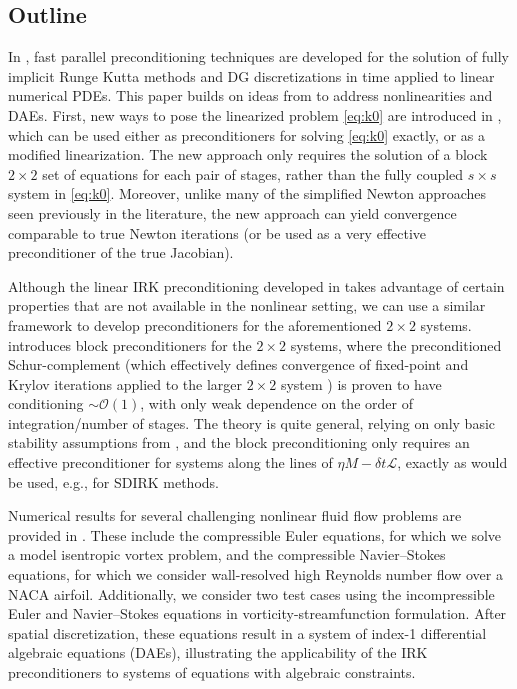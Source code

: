 \documentclass[review]{siamart}
\begin{document}
\subsection{Outline}\label{sec:intro:outline}

In \cite{irk1}, fast parallel preconditioning techniques are developed for the
solution of fully implicit Runge Kutta methods and DG discretizations in time
applied to linear numerical PDEs. This paper builds on ideas from \cite{irk1} to
address nonlinearities and DAEs. First, new ways to pose the linearized problem
\eqref{eq:k0} are introduced in , which can be used either
as preconditioners for solving \eqref{eq:k0} exactly, or as a modified
linearization. The new approach only requires the solution of a block $2\times
2$ set of equations for each pair of stages, rather than the fully coupled
$s\times s$ system in \eqref{eq:k0}. Moreover, unlike many of the simplified
Newton approaches seen previously in the literature, the new approach can yield
convergence comparable to true Newton iterations (or be used as a very effective
preconditioner of the true Jacobian).

Although the linear IRK preconditioning developed in \cite{irk1} takes
advantage of certain properties that are not available in the nonlinear
setting, we can use a similar framework to develop preconditioners for the
aforementioned $2\times 2$ systems.  introduces block
preconditioners for the $2\times 2$ systems, where the preconditioned
Schur-complement (which effectively defines convergence of fixed-point
and Krylov iterations applied to the larger $2\times 2$ system
\cite{2x2block}) is proven to have conditioning $\sim\mathcal{O}(1)$,
with only weak dependence on the order of integration/number of stages.
The theory is quite general, relying on only basic stability assumptions
from , and the block preconditioning only requires
an effective preconditioner for systems along the lines of
$\eta M - \delta t\mathcal{L}$, exactly as would be used, e.g., for
SDIRK methods.

Numerical results for several challenging nonlinear fluid flow problems are
provided in . These include the compressible Euler equations,
for which we solve a model isentropic vortex problem, and the compressible
Navier--Stokes equations, for which we consider wall-resolved high Reynolds
number flow over a NACA airfoil. Additionally, we consider two test cases using
the incompressible Euler and Navier--Stokes equations in
vorticity-streamfunction formulation. After spatial discretization, these
equations result in a system of index-1 differential algebraic equations (DAEs),
illustrating the applicability of the IRK preconditioners to systems of
equations with algebraic constraints.
\end{document}
